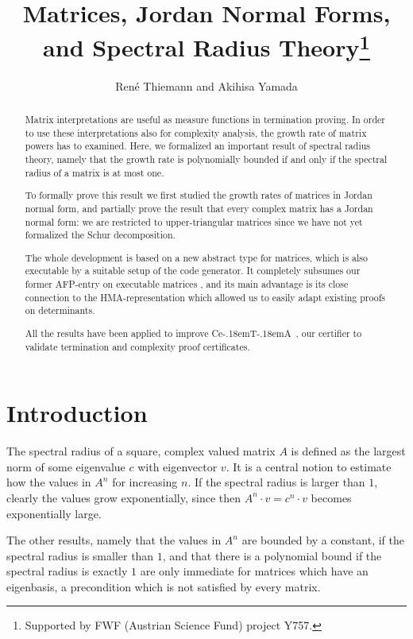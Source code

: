 \documentclass[11pt,a4paper]{article}
\newcommand\ceta{\textsf{Ce\kern-.18emT\kern-.18emA}}
\begin{document}
\title{Matrices, Jordan Normal Forms, and Spectral Radius Theory\footnote{Supported by FWF (Austrian Science Fund) project Y757.}}
\author{Ren\'e Thiemann and Akihisa Yamada}
\maketitle

\begin{abstract}
  Matrix interpretations are useful as measure functions in termination proving.
  In order to use these interpretations also for complexity analysis, 
  the growth rate of matrix powers has to examined. Here, we formalized
  an important result of spectral radius theory, namely that the growth rate
  is polynomially bounded if and only if the spectral radius of a matrix is at most one. 
  
  To formally prove this result we first studied the growth rates of matrices
  in Jordan normal form, and partially prove the result that every 
  complex matrix has a Jordan normal form: we are restricted to
  upper-triangular matrices since we have not yet formalized the Schur decomposition.
  
  The whole development is based on a new abstract type for matrices, which is
  also executable by a suitable setup of the code generator. It 
  completely subsumes our former AFP-entry on executable matrices 
  \cite{Matrix-AFP}, and its main advantage is its close connection to the
  HMA-representation which allowed us to easily adapt existing proofs on 
  determinants.
  
 All the results have been applied to improve \ceta\ \cite{CeTA,CeTAcomplexity},
 our certifier to validate termination and complexity proof certificates.
\end{abstract}

\tableofcontents

\section{Introduction}

The spectral radius of a square, complex valued matrix $A$ is defined as the 
largest norm of some eigenvalue $c$ with eigenvector $v$. 
It is a central notion to estimate how
the values in $A^n$ for increasing $n$. If the spectral radius is larger
than $1$, clearly the values grow exponentially, since then 
$A^n \cdot v = c^n \cdot v$ becomes exponentially large. 

The other results, namely
that the values in $A^n$ are bounded by a constant, 
if the spectral radius is smaller
than $1$, and that there is a polynomial bound if the spectral radius
is exactly $1$ are only immediate for matrices which have an eigenbasis,
a precondition which is not satisfied by every matrix.
\end{document}
